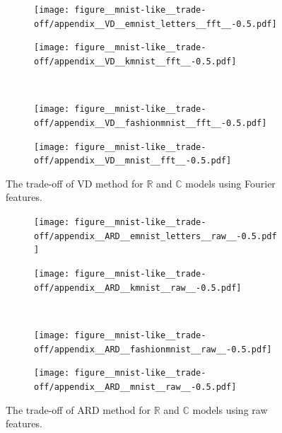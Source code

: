 \documentclass[a4paper]{extarticle}
\newcommand{\real}{\mathbb{R}}
\newcommand{\cplx}{\mathbb{C}}
\begin{document}
\begin{figure}[ht]
  \centering
  \begin{subfigure}[b]{0.5\textwidth}
    \centering
    \texttt{[image: figure\_\_mnist-like\_\_trade-off/appendix\_\_VD\_\_emnist\_letters\_\_fft\_\_-0.5.pdf]}
  \end{subfigure}%
  \begin{subfigure}[b]{0.5\textwidth}
    \centering
    \texttt{[image: figure\_\_mnist-like\_\_trade-off/appendix\_\_VD\_\_kmnist\_\_fft\_\_-0.5.pdf]}
  \end{subfigure} \\ %
  \begin{subfigure}[b]{0.5\textwidth}
    \centering
    \texttt{[image: figure\_\_mnist-like\_\_trade-off/appendix\_\_VD\_\_fashionmnist\_\_fft\_\_-0.5.pdf]}
  \end{subfigure}%
  \begin{subfigure}[b]{0.5\textwidth}
    \centering
    \texttt{[image: figure\_\_mnist-like\_\_trade-off/appendix\_\_VD\_\_mnist\_\_fft\_\_-0.5.pdf]}
  \end{subfigure}
  \caption{%
    The trade-off of VD method for $\real$ and $\cplx$ models using Fourier features.
  }
  \label{fig:appendix__mnist-like__trade-off__VD__fft}
\end{figure}

\begin{figure}[ht]
  \centering
  \begin{subfigure}[b]{0.5\textwidth}
    \centering
    \texttt{[image: figure\_\_mnist-like\_\_trade-off/appendix\_\_ARD\_\_emnist\_letters\_\_raw\_\_-0.5.pdf]}
  \end{subfigure}%
  \begin{subfigure}[b]{0.5\textwidth}
    \centering
    \texttt{[image: figure\_\_mnist-like\_\_trade-off/appendix\_\_ARD\_\_kmnist\_\_raw\_\_-0.5.pdf]}
  \end{subfigure} \\%
  \begin{subfigure}[b]{0.5\textwidth}
    \centering
    \texttt{[image: figure\_\_mnist-like\_\_trade-off/appendix\_\_ARD\_\_fashionmnist\_\_raw\_\_-0.5.pdf]}
  \end{subfigure}%
  \begin{subfigure}[b]{0.5\textwidth}
    \centering
    \texttt{[image: figure\_\_mnist-like\_\_trade-off/appendix\_\_ARD\_\_mnist\_\_raw\_\_-0.5.pdf]}
  \end{subfigure}
  \caption{%
    The trade-off of ARD method for $\real$ and $\cplx$ models using raw features.
  }
  \label{fig:appendix__mnist-like__trade-off__ARD__raw}
\end{figure}
\end{document}

